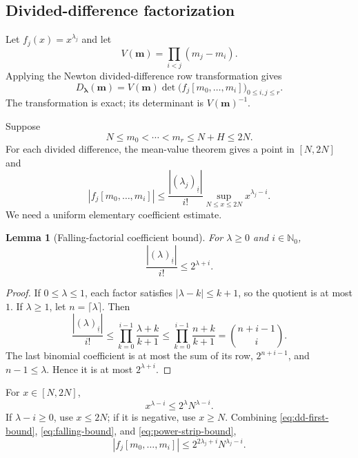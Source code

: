 \documentclass[11pt,oneside]{article}
\newtheorem{lemma}[theorem]{Lemma}
\theoremstyle{definition}
\theoremstyle{remark}
\newcommand{\Nzero}{\mathbb N_0}
\newcommand{\fall}[2]{\left(#1\right)_{\!\underline{#2}}}
\begin{document}
\subsection{Divided-difference factorization}

Let $f_j(x)=x^{\lambda_j}$ and let
\[
 V(\boldsymbol m)=\prod_{i<j}(m_j-m_i).
\]
Applying the Newton divided-difference row transformation gives
\begin{equation}
 D_{\boldsymbol\lambda}(\boldsymbol m)
 =V(\boldsymbol m)
  \det\bigl(f_j[m_0,\ldots,m_i]\bigr)_{0\le i,j\le r}.
 \label{eq:newton-factorization}
\end{equation}
The transformation is exact; its determinant is $V(\boldsymbol m)^{-1}$.

Suppose
\[
 N\le m_0<\cdots<m_r\le N+H\le2N.
\]
For each divided difference, the mean-value theorem gives a point in $[N,2N]$ and
\begin{equation}
 |f_j[m_0,\ldots,m_i]|
 \le
 \frac{|\fall{\lambda_j}{i}|}{i!}
 \sup_{N\le x\le2N}x^{\lambda_j-i}.
 \label{eq:dd-first-bound}
\end{equation}
We need a uniform elementary coefficient estimate.

\begin{lemma}[Falling-factorial coefficient bound]
\label{lem:falling-bound}
For $\lambda\ge0$ and $i\in\Nzero$,
\begin{equation}
 \frac{|\fall{\lambda}{i}|}{i!}\le2^{\lambda+i}.
 \label{eq:falling-bound}
\end{equation}
\end{lemma}

\begin{proof}
If $0\le\lambda\le1$, each factor satisfies
$|\lambda-k|\le k+1$, so the quotient is at most $1$.
If $\lambda\ge1$, let $n=\lceil\lambda\rceil$.  Then
\[
 \frac{|\fall{\lambda}{i}|}{i!}
 \le\prod_{k=0}^{i-1}\frac{\lambda+k}{k+1}
 \le\prod_{k=0}^{i-1}\frac{n+k}{k+1}
 =\binom{n+i-1}{i}.
\]
The last binomial coefficient is at most the sum of its row,
$2^{n+i-1}$, and $n-1\le\lambda$.  Hence it is at most $2^{\lambda+i}$.
\end{proof}

For $x\in[N,2N]$,
\begin{equation}
 x^{\lambda-i}\le2^\lambda N^{\lambda-i}.
 \label{eq:power-strip-bound}
\end{equation}
If $\lambda-i\ge0$, use $x\le2N$; if it is negative, use $x\ge N$.
Combining \eqref{eq:dd-first-bound}, \eqref{eq:falling-bound}, and
\eqref{eq:power-strip-bound},
\begin{equation}
 |f_j[m_0,\ldots,m_i]|
 \le2^{2\lambda_j+i}N^{\lambda_j-i}.
 \label{eq:dd-final-bound}
\end{equation}
\end{document}
